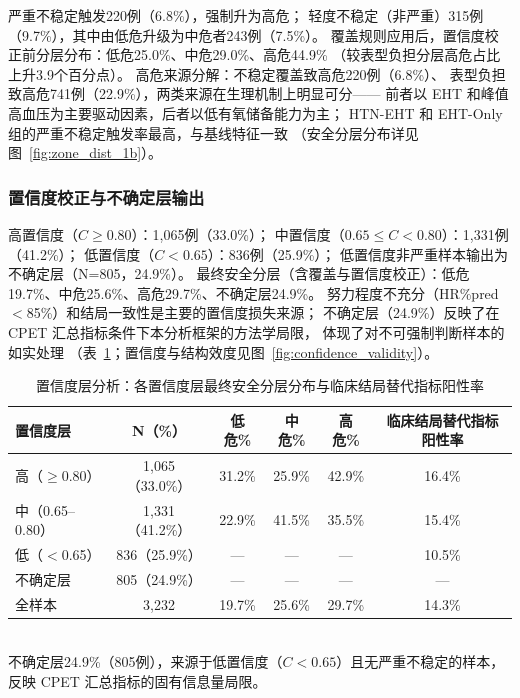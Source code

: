 \documentclass[12pt, a4paper]{ctexart}
\begin{document}
严重不稳定触发220例（6.8\%），强制升为高危；
轻度不稳定（非严重）315例（9.7\%），其中由低危升级为中危者243例（7.5\%）。
覆盖规则应用后，置信度校正前分层分布：低危25.0\%、中危29.0\%、高危44.9\%
（较表型负担分层高危占比上升3.9个百分点）。
高危来源分解：不稳定覆盖致高危220例（6.8\%）、
表型负担致高危741例（22.9\%），两类来源在生理机制上明显可分——
前者以 EHT 和峰值高血压为主要驱动因素，后者以低有氧储备能力为主；
HTN-EHT 和 EHT-Only 组的严重不稳定触发率最高，与基线特征一致
（安全分层分布详见图~\ref{fig:zone_dist_1b}）。

\subsubsection{置信度校正与不确定层输出}

高置信度（$C \geq 0.80$）：1,065例（33.0\%）；
中置信度（$0.65 \leq C < 0.80$）：1,331例（41.2\%）；
低置信度（$C < 0.65$）：836例（25.9\%）；
低置信度非严重样本输出为不确定层（N=805，24.9\%）。
最终安全分层（含覆盖与置信度校正）：低危19.7\%、中危25.6\%、高危29.7\%、不确定层24.9\%。
努力程度不充分（HR\%pred $<$85\%）和结局一致性是主要的置信度损失来源；
不确定层（24.9\%）反映了在 CPET 汇总指标条件下本分析框架的方法学局限，
体现了对不可强制判断样本的如实处理
（表~\ref{tab:confidence_layers}；置信度与结构效度见图~\ref{fig:confidence_validity}）。

\begin{table}[htbp]
\centering
\small
\caption{置信度层分析：各置信度层最终安全分层分布与临床结局替代指标阳性率}
\label{tab:confidence_layers}
\begin{tabular}{lccccc}
\toprule
置信度层 & N（\%）& 低危\% & 中危\% & 高危\% & 临床结局替代指标阳性率 \\
\midrule
高（$\geq$0.80）& 1,065（33.0\%）& 31.2\% & 25.9\% & 42.9\% & 16.4\% \\
中（0.65--0.80）& 1,331（41.2\%）& 22.9\% & 41.5\% & 35.5\% & 15.4\% \\
低（$<$0.65）& 836（25.9\%）& — & — & — & 10.5\% \\
不确定层 & 805（24.9\%）& — & — & — & — \\
\midrule
全样本 & 3,232 & 19.7\% & 25.6\% & 29.7\% & 14.3\% \\
\bottomrule
\end{tabular}
\\[1ex]
{\footnotesize 不确定层24.9\%（805例），来源于低置信度（$C<0.65$）且无严重不稳定的样本，
反映 CPET 汇总指标的固有信息量局限。}
\end{table}
\end{document}
